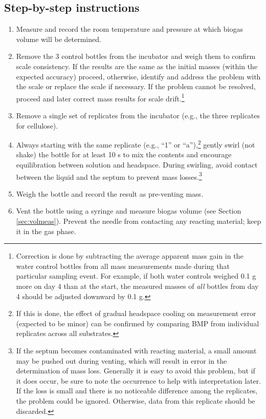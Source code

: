 \documentclass[]{article}
\begin{document}
\subsection{Step-by-step instructions} \label{sec:steps}
\begin{enumerate}
    \item Measure and record the room temperature and pressure at which biogas volume will be determined.
    \item Remove the 3 control bottles from the incubator and weigh them to confirm scale consistency. 
      If the results are the same as the initial masses (within the expected accuracy) proceed, otherwise, identify and address the problem with the scale or replace the scale if necessary.
      If the problem cannot be resolved, proceed and later correct mass results for scale drift.\footnote{
        Correction is done by subtracting the average apparent mass gain in the water control bottles from all mass measurements made during that particular sampling event. 
        For example, if both water controls weighed 0.1 g more on day 4 than at the start, the measured masses of \textit{all} bottles from day 4 should be adjusted downward by 0.1 g.
      }
    \item Remove a single set of replicates from the incubator (e.g., the three replicates for cellulose).
    \item Always starting with the same replicate (e.g., ``1'' or ``a''),\footnote{
        If this is done, the effect of gradual headspace cooling on measurement error (expected to be minor) can be confirmed by comparing BMP from individual replicates across all substrates.
      } gently swirl (not shake) the bottle for at least 10 s to mix the contents and encourage  equilibration between solution and headspace. 
      During swirling, avoid contact between the liquid and the septum to prevent mass losses.\footnote{
        If the septum becomes contaminated with reacting material, a small amount may be pushed out during venting, which will result in error in the determination of mass loss.
        Generally it is easy to avoid this problem, but if it does occur, be sure to note the occurrence to help with interpretation later.
        If the loss is small and there is no noticeable difference among the replicates, the problem could be ignored. 
        Otherwise, data from this replicate should be discarded.
      }
    \item Weigh the bottle and record the result as pre-venting mass.
    \item Vent the bottle using a syringe and measure biogas volume (see Section \ref{sec:volmeas}). Prevent the needle from contacting any reacting material; keep it in the gas phase. 

\end{enumerate}
\end{document}
